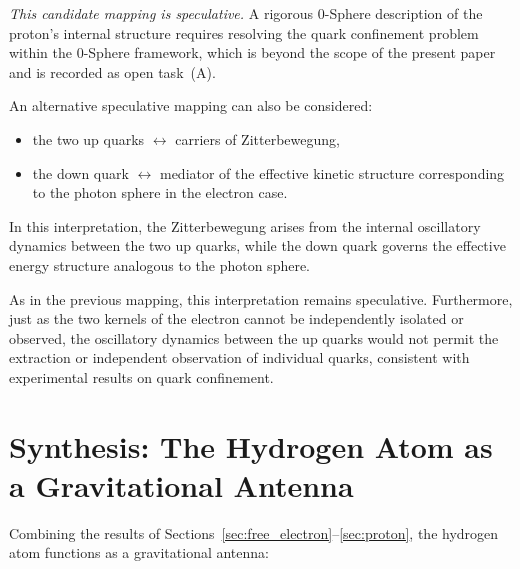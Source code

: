 \documentclass[%
 reprint, amsmath,amssymb, aps, prd, ]{revtex4-2}
\numberwithin{equation}{section}
\begin{document}
\textit{This candidate mapping is speculative.} A rigorous 0-Sphere description of the proton's internal structure requires resolving the quark confinement problem within the 0-Sphere framework, which is beyond the scope of the present paper and is recorded as open task~(A).

\vspace{2mm}

An alternative speculative mapping can also be considered:

\begin{itemize}[leftmargin=2em, itemsep=2pt]
\item the two up quarks $\leftrightarrow$ carriers of Zitterbewegung,
\item the down quark $\leftrightarrow$ mediator of the effective kinetic structure corresponding to the photon sphere in the electron case.
\end{itemize}

In this interpretation, the Zitterbewegung arises from the internal oscillatory dynamics between the two up quarks, while the down quark governs the effective energy structure analogous to the photon sphere.

As in the previous mapping, this interpretation remains speculative. Furthermore, just as the two kernels of the electron cannot be independently isolated or observed, the oscillatory dynamics between the up quarks would not permit the extraction or independent observation of individual quarks, consistent with experimental results on quark confinement.

\section{Synthesis: The Hydrogen Atom as a Gravitational Antenna}
\label{sec:hydrogen}

Combining the results of Sections~\ref{sec:free_electron}--\ref{sec:proton}, the hydrogen atom functions as a gravitational antenna:
\end{document}
